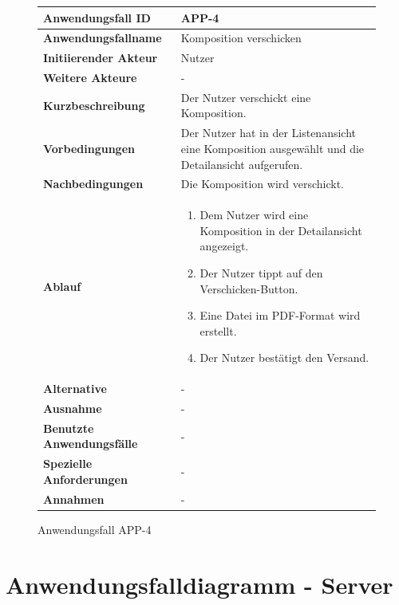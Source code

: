 \begin{figure}[h]
	\centering
	\begin{tabularx}{\textwidth}{ X | X }
		\textbf{Anwendungsfall ID} & APP-4 \\ \hline
		\textbf{Anwendungsfallname} & Komposition verschicken \\ \hline
		\textbf{Initiierender Akteur} & Nutzer \\ \hline
		\textbf{Weitere Akteure} & -  \\ \hline
		\textbf{Kurzbeschreibung} & Der Nutzer verschickt eine Komposition.  \\ \hline
		\textbf{Vorbedingungen} & Der Nutzer hat in der Listenansicht eine Komposition ausgewählt und die Detailansicht aufgerufen.  \\ \hline
		\textbf{Nachbedingungen} & Die Komposition wird verschickt.  \\ \hline
		\textbf{Ablauf} &
		\begin{enumerate}
			\item Dem Nutzer wird eine Komposition in der Detailansicht angezeigt.
			\item Der Nutzer tippt auf den Verschicken-Button.
			\item Eine Datei im PDF-Format wird erstellt.
			\item Der Nutzer bestätigt den Versand.
		\end{enumerate} \\ \hline
		\textbf{Alternative} &
		-  \\ \hline
		\textbf{Ausnahme} &
		- \\ \hline
		\textbf{Benutzte Anwendungsfälle} & - \\ \hline
		\textbf{Spezielle Anforderungen} & - \\ \hline
		\textbf{Annahmen} & -
	\end{tabularx}
	\caption{Anwendungsfall APP-4}
	\label{fig:anwendungsfall-app-tabelle-APP-4}
\end{figure}

\newpage


\section{Anwendungsfalldiagramm - Server}

